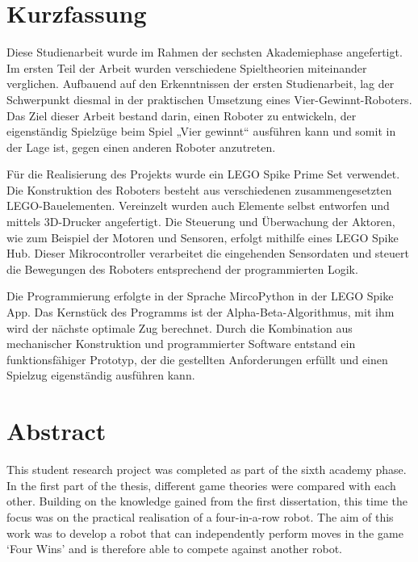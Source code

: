 \chapter*{Kurzfassung} %

%
%
%
 

Diese Studienarbeit wurde im Rahmen der sechsten Akademiephase angefertigt. Im ersten Teil der Arbeit wurden verschiedene Spieltheorien miteinander verglichen.
Aufbauend auf den Erkenntnissen der ersten Studienarbeit, lag der Schwerpunkt diesmal in der praktischen Umsetzung eines Vier-Gewinnt-Roboters. Das Ziel dieser Arbeit bestand darin, einen Roboter zu entwickeln, der eigenständig Spielzüge beim Spiel „Vier gewinnt“ ausführen kann und somit in der Lage ist, gegen einen anderen Roboter anzutreten.

Für die Realisierung des Projekts wurde ein LEGO Spike Prime Set verwendet. Die Konstruktion des Roboters besteht aus verschiedenen zusammengesetzten LEGO-Bauelementen. Vereinzelt wurden auch Elemente selbst entworfen und mittels 3D-Drucker angefertigt.  
Die Steuerung und Überwachung der Aktoren, wie zum Beispiel der Motoren und Sensoren, erfolgt mithilfe eines LEGO Spike Hub. Dieser Mikrocontroller verarbeitet die eingehenden Sensordaten und steuert die Bewegungen des Roboters entsprechend der programmierten Logik.

Die Programmierung erfolgte in der Sprache MircoPython in der LEGO Spike App.
Das Kernstück des Programms ist der Alpha-Beta-Algorithmus, mit ihm wird der nächste optimale Zug berechnet.
Durch die Kombination aus mechanischer Konstruktion und programmierter Software entstand ein funktionsfähiger Prototyp, der die gestellten Anforderungen erfüllt und einen Spielzug eigenständig ausführen kann.

\clearpage

\chapter*{Abstract} %

This student research project was completed as part of the sixth academy phase. In the first part of the thesis, different game theories were compared with each other.
Building on the knowledge gained from the first dissertation, this time the focus was on the practical realisation of a four-in-a-row robot. The aim of this work was to develop a robot that can independently perform moves in the game ‘Four Wins’ and is therefore able to compete against another robot.

